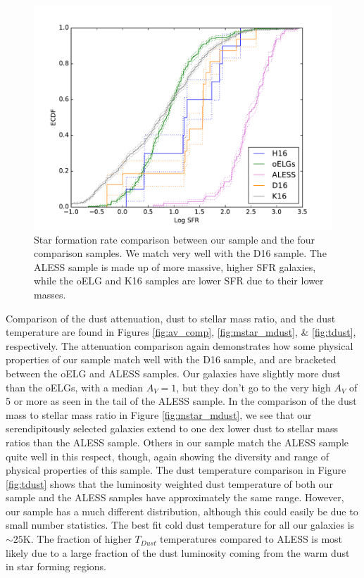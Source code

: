 \documentclass[preprint,natbib209]{aastex}
\begin{document}
\begin{figure}[t]
\centering
\includegraphics[scale=0.8]{ecdf_sfr.pdf}
\caption{Star formation rate comparison between our sample and the four comparison samples. We match very well with the D16 sample. The ALESS sample is made up of more massive, higher SFR galaxies, while the oELG and K16 samples are lower SFR due to their lower masses.}
\label{fig:sfr_comp}
\end{figure}

Comparison of the dust attenuation, dust to stellar mass ratio, and the dust temperature are found in Figures \ref{fig:av_comp}, \ref{fig:mstar_mdust}, \& \ref{fig:tdust}, respectively. The attenuation comparison again demonstrates how some physical properties of our sample match well with the D16 sample, and are bracketed between the oELG and ALESS samples. Our galaxies have slightly more dust than the oELGs, with a median $A_V = 1$, but they don't go to the very high $A_V$ of 5 or more as seen in the tail of the ALESS sample. In the comparison of the dust mass to stellar mass ratio in Figure \ref{fig:mstar_mdust}, we see that our serendipitously selected galaxies extend to one dex lower dust to stellar mass ratios than the ALESS sample. Others in our sample match the ALESS sample quite well in this respect, though, again showing the diversity and range of physical properties of this sample. The dust temperature comparison in Figure \ref{fig:tdust} shows that the luminosity weighted dust temperature of both our sample and the ALESS samples have approximately the same range. However, our sample has a much different distribution, although this could easily be due to small number statistics. The best fit cold dust temperature for all our galaxies is $\sim 25$K. The fraction of higher $T_{Dust}$ temperatures compared to ALESS is most likely due to a large fraction of the dust luminosity coming from the warm dust in star forming regions.
\end{document}
